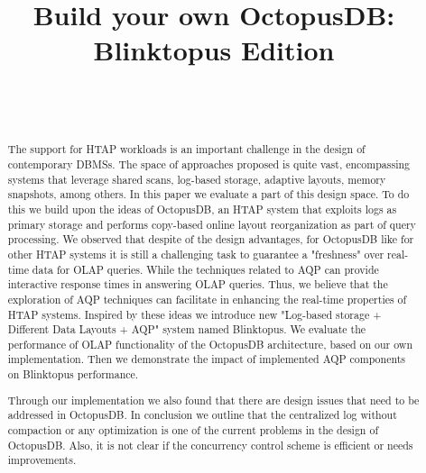 \documentclass[10pt, conference, compsocconf]{IEEEtran}
\begin{document}
\title{Build your own OctopusDB: Blinktopus Edition}
\author{ \\  \\ }

\author{
}

\maketitle

\begin{abstract}
The support for HTAP workloads is an important challenge in the design of contemporary DBMSs. The space of approaches proposed is quite vast, encompassing systems that leverage shared scans, log-based storage, adaptive layouts, memory snapshots, among others. In this paper we evaluate a part of this design space. To do this we build upon the ideas of OctopusDB, an HTAP system that exploits logs as primary storage and performs copy-based online layout reorganization as part of query processing. We observed that despite of the design advantages, for OctopusDB like for other HTAP systems it is still a challenging task to guarantee a "freshness" over real-time data for OLAP queries. While the techniques related to AQP can provide interactive response times in answering OLAP queries. Thus, we believe that the exploration of AQP  techniques can facilitate in enhancing the real-time properties of HTAP systems. Inspired by these ideas we introduce new "Log-based storage + Different Data Layouts + AQP" system named Blinktopus. We evaluate the performance of OLAP functionality of the OctopusDB architecture, based on our own implementation. Then we demonstrate the impact of implemented AQP components on Blinktopus performance.

Through our implementation we also found that there are design issues that need to be addressed in OctopusDB. In conclusion we outline that the centralized log without compaction or any optimization is one of the current problems in the design of OctopusDB. Also, it is not clear if the concurrency control scheme is efficient or needs improvements.
\end{abstract}
\end{document}
